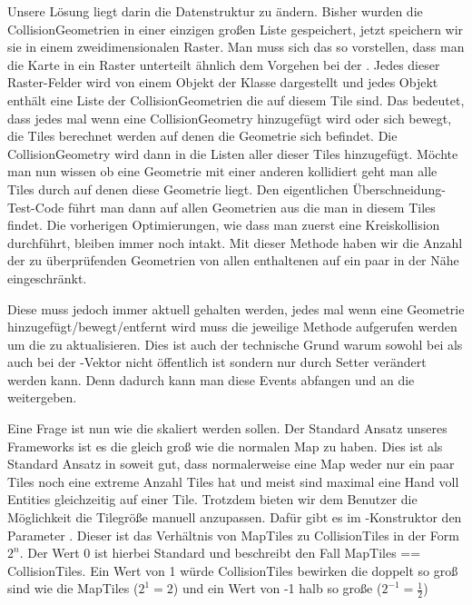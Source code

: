 Unsere Lösung liegt darin die Datenstruktur zu ändern. Bisher wurden die CollisionGeometrien in einer einzigen großen Liste gespeichert, jetzt speichern wir sie in einem zweidimensionalen Raster.
Man muss sich das so vorstellen, dass man die Karte in ein Raster unterteilt ähnlich dem Vorgehen bei der . Jedes dieser Raster-Felder wird von einem Objekt der Klasse  dargestellt und jedes Objekt enthält eine Liste der CollisionGeometrien die auf diesem Tile sind.
Das bedeutet, dass jedes mal wenn eine CollisionGeometry hinzugefügt wird oder sich bewegt, die Tiles berechnet werden auf denen die Geometrie sich befindet. Die CollisionGeometry wird dann in die Listen aller dieser Tiles hinzugefügt. Möchte man nun wissen ob eine Geometrie mit einer anderen kollidiert geht man alle Tiles durch auf denen diese Geometrie liegt. Den eigentlichen Überschneidung-Test-Code führt man dann auf allen Geometrien aus die man in diesem Tiles findet. Die vorherigen Optimierungen, wie dass man zuerst eine Kreiskollision durchführt, bleiben immer noch intakt. Mit dieser Methode haben wir die Anzahl der zu überprüfenden Geometrien von allen enthaltenen auf ein paar in der Nähe eingeschränkt.

Diese  muss jedoch immer aktuell gehalten werden, jedes mal wenn eine Geometrie hinzugefügt/bewegt/entfernt wird muss die jeweilige Methode aufgerufen werden um die  zu aktualisieren. Dies ist auch der technische Grund warum sowohl bei  als auch bei  der -Vektor nicht öffentlich ist sondern nur durch Setter verändert werden kann. Denn dadurch kann man diese Events abfangen und an die  weitergeben.

Eine Frage ist nun wie die  skaliert werden sollen. Der Standard Ansatz unseres Frameworks ist es die  gleich groß wie die normalen Map  zu haben.
Dies ist als Standard Ansatz in soweit gut, dass normalerweise eine Map weder nur ein paar Tiles noch eine extreme Anzahl Tiles hat und meist sind maximal eine Hand voll Entities gleichzeitig auf einer Tile.
Trotzdem bieten wir dem Benutzer die Möglichkeit die Tilegröße manuell anzupassen.
Dafür gibt es im -Konstruktor den Parameter .
Dieser ist das Verhältnis von MapTiles zu CollisionTiles in der Form $ 2^n $.
Der Wert 0 ist hierbei Standard und beschreibt den Fall MapTiles == CollisionTiles.
Ein Wert von 1 würde CollisionTiles bewirken die doppelt so groß sind wie die MapTiles ($2^1 = 2$) und ein Wert von -1 halb so große ($2^{-1} = \frac{1}{2}$)

